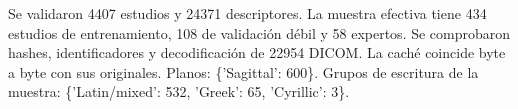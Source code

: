 Se validaron 4407 estudios y 24371 descriptores. La muestra efectiva tiene 434 estudios de entrenamiento, 108 de validación débil y 58 expertos. Se comprobaron hashes, identificadores y decodificación de 22954 DICOM. La caché coincide byte a byte con sus originales. Planos: \{'Sagittal': 600\}. Grupos de escritura de la muestra: \{'Latin/mixed': 532, 'Greek': 65, 'Cyrillic': 3\}.